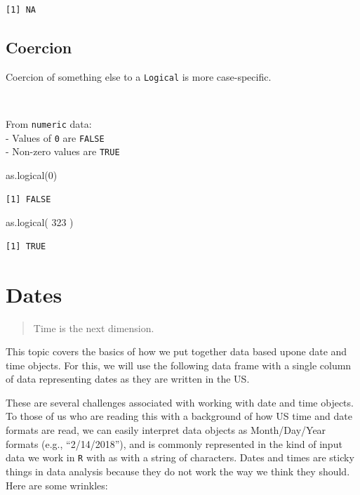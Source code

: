\documentclass[
  letterpaper,
]{book}
\newenvironment{Shaded}{\begin{snugshade}}{\end{snugshade}}
\newcommand{\DecValTok}[1]{\textcolor[rgb]{0.68,0.00,0.00}{#1}}
\newcommand{\FunctionTok}[1]{\textcolor[rgb]{0.28,0.35,0.67}{#1}}
\newcommand{\NormalTok}[1]{\textcolor[rgb]{0.00,0.23,0.31}{#1}}
\begin{document}
\begin{verbatim}
[1] NA
\end{verbatim}

\subsection{Coercion}\label{coercion}

Coercion of something else to a \texttt{Logical} is more case-specific.

~

From \texttt{numeric} data:\\
- Values of \texttt{0} are \texttt{FALSE}\\
- Non-zero values are \texttt{TRUE}

\begin{Shaded}
\begin{Highlighting}[]
\FunctionTok{as.logical}\NormalTok{(}\DecValTok{0}\NormalTok{)}
\end{Highlighting}
\end{Shaded}

\begin{verbatim}
[1] FALSE
\end{verbatim}

\begin{Shaded}
\begin{Highlighting}[]
\FunctionTok{as.logical}\NormalTok{( }\DecValTok{323}\NormalTok{ )}
\end{Highlighting}
\end{Shaded}

\begin{verbatim}
[1] TRUE
\end{verbatim}

\section{Dates}\label{dates}

\begin{quote}
Time is the next dimension.
\end{quote}

This topic covers the basics of how we put together data based upone
date and time objects. For this, we will use the following data frame
with a single column of data representing dates as they are written in
the US.

These are several challenges associated with working with date and time
objects. To those of us who are reading this with a background of how US
time and date formats are read, we can easily interpret data objects as
Month/Day/Year formats (e.g., ``2/14/2018''), and is commonly
represented in the kind of input data we work in \texttt{R} with as with
a string of characters. Dates and times are sticky things in data
analysis because they do not work the way we think they should. Here are
some wrinkles:
\end{document}
